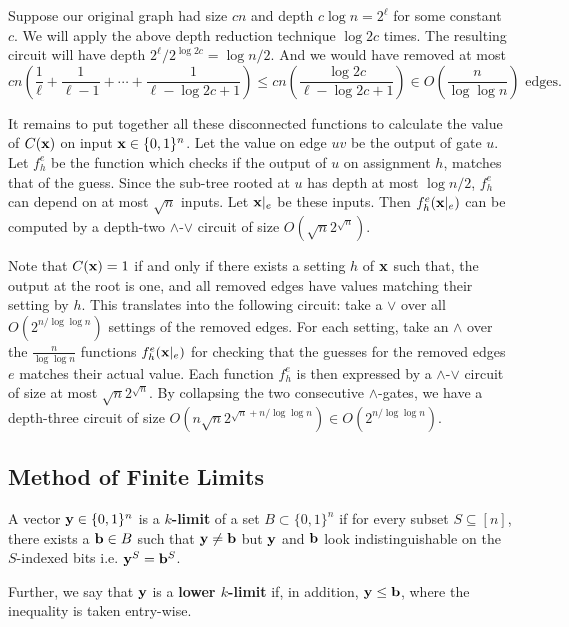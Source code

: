 \documentclass[11pt]{article}
\begin{document}
 	Suppose our original graph had size $cn$ and depth $c\log n = 2^{\ell}$ for some constant $c$. We will apply the above depth reduction technique $\log 2c$ times. The resulting circuit will have depth $2^{\ell}/2^{\log 2c} = \log n/ 2$. And we would have removed at most 
 	\[cn\left(\frac{1}{\ell} + \frac{1}{\ell - 1} + \cdots + \frac{1}{\ell - \log 2c + 1}\right) \leq cn \left(\frac{\log 2c}{\ell - \log 2c + 1}\right) \in O\left(\frac{n}{\log \log n}\right) \mbox{ edges.}\] 
 	
 	It remains to put together all these disconnected functions to calculate the value of $C(\mathbf{x})$ on input $\mathbf{x} \in \{0,1\}^n$. Let the value on edge $uv$ be the output of gate $u$. Let $f^{e}_h$ be the function which checks if the output of $u$ on assignment $h$, matches that of the guess. Since the sub-tree rooted at $u$ has depth at most $\log n/ 2$, $f^{e}_h$ can depend on at most $\sqrt{n}$ inputs. Let $\mathbf{x}|_e$ be these inputs. Then $f^{e}_h(\mathbf{x}|_{e})$ can be computed by a depth-two $\land$-$\lor$ circuit of size $O(\sqrt{n} 2^{\sqrt{n}})$. 
 	
 	Note that $C(\mathbf{x}) = 1$ if and only if there exists a setting $h$ of $\mathbf{x}$ such that, the output at the root is one, and all removed edges have values matching their setting by $h$. This translates into the following circuit: take a $\lor$ over all $O(2^{n/\log\log n})$ settings of the removed edges. For each setting, take an $\land$ over the $\frac{n}{\log\log n}$ functions $f^e_h(\mathbf{x}|_{e})$ for checking that the guesses for the removed edges $e$ matches their actual value. Each function $f^{e}_h$ is then expressed by a $\land$-$\lor$ circuit of size at most $\sqrt{n}2^{\sqrt{n}}$. By collapsing the two consecutive $\land$-gates, we have a depth-three circuit of size $O\left(n\sqrt{n}2^{\sqrt{n} + n/\log\log n}\right) \in O\left(2^{n/\log\log n}\right)$. 
 	
 	\subsection{Method of Finite Limits}
 	\begin{definition}
 		\label{def:finitelimit}
 		A vector $\mathbf{y} \in \{0,1\}^n$ is a \textbf{$k$-limit} of a set $B \subset \{0,1\}^n$ if for every subset $S \subseteq [n]$, there exists a $\mathbf{b} \in B$ such that $\mathbf{y} \neq \mathbf{b}$ but $\mathbf{y}$ and $\mathbf{b}$ look indistinguishable on the $S$-indexed bits i.e. $\mathbf{y}^{S} = \mathbf{b}^{S}$.
 		
 		Further, we say that $\mathbf{y}$ is a \textbf{lower $k$-limit} if, in addition, $\mathbf{y} \leq \mathbf{b}$, where the inequality is taken entry-wise.  
 	\end{definition}
 
\end{document}
